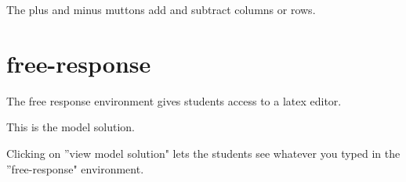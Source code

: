 \documentclass{ximera}
\begin{document}
The plus and minus muttons add and subtract columns or rows.  

\section{free-response}

The free response environment gives students access to a latex editor. 

\begin{free-response}
	This is the model solution.
\end{free-response}

Clicking on ''view model solution" lets the students see whatever you typed in the ''free-response" environment.






	
	
\end{document}
